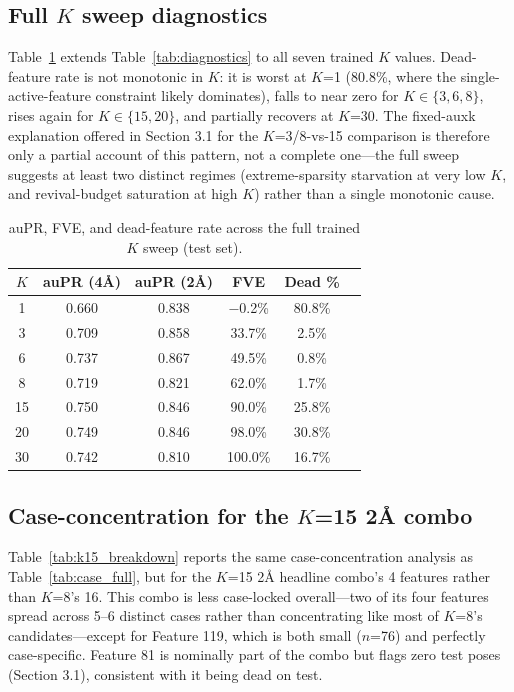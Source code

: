 \documentclass{article}
\begin{document}
\subsection{Full $K$ sweep diagnostics}
\label{app:full-sweep}

Table~\ref{tab:full_diag} extends Table~\ref{tab:diagnostics} to all seven trained $K$ values. Dead-feature rate is not monotonic in $K$: it is worst at $K$=1 (80.8\%, where the single-active-feature constraint likely dominates), falls to near zero for $K \in \{3,6,8\}$, rises again for $K \in \{15,20\}$, and partially recovers at $K$=30. The fixed-auxk explanation offered in Section 3.1 for the $K$=3/8-vs-15 comparison is therefore only a partial account of this pattern, not a complete one---the full sweep suggests at least two distinct regimes (extreme-sparsity starvation at very low $K$, and revival-budget saturation at high $K$) rather than a single monotonic cause.

\begin{table}[!ht]
\caption{\small auPR, FVE, and dead-feature rate across the full trained $K$ sweep (test set).}
\label{tab:full_diag}
\centering
\begin{small}
\begin{tabular}{cccccc}
\toprule
$K$ & auPR (4Å) & auPR (2Å) & FVE & Dead \% \\
\midrule
1  & 0.660 & 0.838 & $-$0.2\% & 80.8\% \\
3  & 0.709 & 0.858 & 33.7\% & 2.5\%  \\
6  & 0.737 & 0.867 & 49.5\% & 0.8\%  \\
8  & 0.719 & 0.821 & 62.0\% & 1.7\%  \\
15 & 0.750 & 0.846 & 90.0\% & 25.8\% \\
20 & 0.749 & 0.846 & 98.0\% & 30.8\% \\
30 & 0.742 & 0.810 & 100.0\% & 16.7\% \\
\bottomrule
\end{tabular}
\end{small}
\end{table}

\subsection{Case-concentration for the $K$=15 2Å combo}
\label{app:k15-breakdown}

Table~\ref{tab:k15_breakdown} reports the same case-concentration analysis as Table~\ref{tab:case_full}, but for the $K$=15 2Å headline combo's 4 features rather than $K$=8's 16. This combo is less case-locked overall---two of its four features spread across 5--6 distinct cases rather than concentrating like most of $K$=8's candidates---except for Feature 119, which is both small ($n$=76) and perfectly case-specific. Feature 81 is nominally part of the combo but flags zero test poses (Section 3.1), consistent with it being dead on test.
\end{document}
